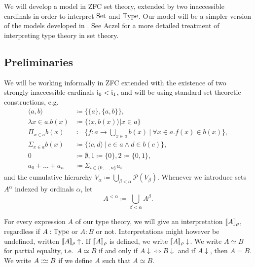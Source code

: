 \documentclass{article}
\begin{document}
We will develop a model in ZFC set theory, extended by two
inaccessible cardinals in order to interpret $\text{Set}$ and $\text{Type}$.  Our
model will be a simpler version of the models developed in
\cite{dybjersetzer1999finax,dybjersetzer2006IIR}. %
See Aczel \cite{aczel1999typesandsets} for a more detailed treatment
of interpreting type theory in set theory.



\subsection{Preliminaries}

We will be working informally in ZFC extended with the existence of two
strongly inaccessible cardinals $\mathfrak{i}_0 < \mathfrak{i}_1$,
and will be using standard set theoretic constructions, e.g.
\begin{align*}
\langle a, b\rangle &\coloneqq \{ \{ a \}, \{ a, b \}\}, \\
\lambda x \in a.b(x) &\coloneqq \{\langle x, b(x)\rangle | x \in a \} \\
\Pi_{x \in a}b(x) &\coloneqq \{ f : a \to \bigcup_{x \in a}b(x)\ |\ \forall x \in a.f(x) \in b(x)\}, \\
\Sigma_{x \in a}b(x) &\coloneqq \{ \langle c , d\rangle\ |\ c \in a \land d
\in b(c) \}, \\
0 &\coloneqq \emptyset, 1 \coloneqq \{0\}, 2 \coloneqq \{0, 1\}, \\
a_0 + \ldots + a_n &\coloneqq \Sigma_{i \in \{0, \ldots, n\}}a_i
\end{align*}
and the cumulative hierarchy $V_{\alpha} \coloneqq
\displaystyle\bigcup_{\beta < \alpha} \mathcal{P}(V_{\beta})$. Whenever we
introduce sets $A^{\alpha}$ indexed by ordinals $\alpha$, let \[A^{< \alpha}
\coloneqq \displaystyle\bigcup_{\beta < \alpha}A^{\beta}.\]

For every expression $A$ of our type theory, we will give an interpretation
$\llbracket A \rrbracket_\rho$, regardless if $A : \text{Type}$ or $A : B$ or not. Interpretations
might however be undefined, written $\llbracket A \rrbracket_\rho\uparrow$. If $\llbracket A \rrbracket_\rho$
is defined, we write $\llbracket A \rrbracket_\rho\downarrow$. We write $A \simeq B$ for
partial equality, i.e.\ $A \simeq B$ if and only if $A\downarrow
\Leftrightarrow B\downarrow$ and if $A\downarrow$, then $A = B$. We write $A
\mathrel{\mathop:}\simeq B$ if we define $A$ such that $A \simeq B$.
\end{document}
